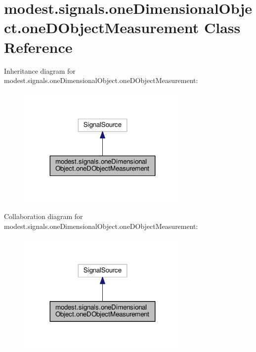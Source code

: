 \hypertarget{classmodest_1_1signals_1_1oneDimensionalObject_1_1oneDObjectMeasurement}{}\section{modest.\+signals.\+one\+Dimensional\+Object.\+one\+D\+Object\+Measurement Class Reference}
\label{classmodest_1_1signals_1_1oneDimensionalObject_1_1oneDObjectMeasurement}


Inheritance diagram for modest.\+signals.\+one\+Dimensional\+Object.\+one\+D\+Object\+Measurement\+:
\nopagebreak
\begin{figure}[H]
\begin{center}
\leavevmode
\includegraphics[width=239pt]{classmodest_1_1signals_1_1oneDimensionalObject_1_1oneDObjectMeasurement__inherit__graph}
\end{center}
\end{figure}


Collaboration diagram for modest.\+signals.\+one\+Dimensional\+Object.\+one\+D\+Object\+Measurement\+:
\nopagebreak
\begin{figure}[H]
\begin{center}
\leavevmode
\includegraphics[width=239pt]{classmodest_1_1signals_1_1oneDimensionalObject_1_1oneDObjectMeasurement__coll__graph}
\end{center}
\end{figure}
